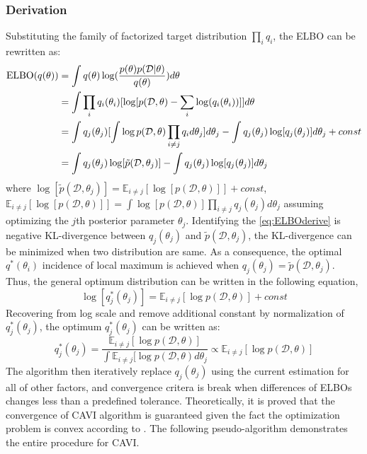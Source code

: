 \subsubsection{Derivation}
Substituting the family of factorized target distribution $\prod_i q_i$, the ELBO can be rewritten as:
\begin{equation}
	\label{eq:ELBOderive}	
	\begin{aligned}
		\textnormal{ELBO}(q(\theta)) &= \int q(\theta)\log(\frac{p(\theta)p(\mathcal{D}|\theta)}{q(\theta)})d\theta \\
		&= \int \prod_i q_i(\theta_i) [\log[p(\mathcal{D},\theta) - \sum_i \log(q_i(\theta_i))]]d\theta \\
		&= \int q_j(\theta_j)[\int \log p(\mathcal{D},\theta) \prod_{i\neq j}q_i d\theta_j]d\theta_j - \int q_j(\theta_j) \log[q_j(\theta_j)]d\theta_j + const\\
		&= \int q_j(\theta_j) \log[\tilde{p}(\mathcal{D},\theta_j)] - \int q_j(\theta_j) \log[q_j(\theta_j)]d\theta_j
	\end{aligned}
\end{equation}
where $\log[\tilde{p}(\mathcal{D},\theta_j)] = \mathbb{E}_{i \neq j}[\log[p(\mathcal{D},\theta)]] + const$,\\ $\mathbb{E}_{i\neq j}[\log[p(\mathcal{D},\theta)]] = \int \log[p(\mathcal{D},\theta)]\prod_{i\neq j}q_j(\theta_j)d\theta_j$ assuming optimizing the $j$th posterior parameter $\theta_j$.
Identifying the \ref{eq:ELBOderive} is negative KL-divergence between $q_j(\theta_j) $ and $\tilde{p}(\mathcal{D},\theta_j)$, the KL-divergence can be minimized when two distribution are same.
As a consequence, the optimal $q^{*}(\theta_i)$ incidence of local maximum is achieved when $q_j(\theta_j) = \tilde{p}(\mathcal{D},\theta_j)$. Thus, the general optimum distribution can be written in the following equation,
\begin{equation}
	\label{eq:logoptimumQ}
	\log[q_j^*(\theta_j)] = \mathbb{E}_{i\neq j}[\log p(\mathcal{D},\theta)] + const
\end{equation}
Recovering from log scale and remove additional constant by normalization of $q_j^*(\theta_j)$, the optimum $q_j^*(\theta_j)$ can be written as:
\begin{equation}
	\label{eq:optimalSolution}
	q_j^*(\theta_j) = \frac{\mathbb{E}_{i\neq j}[\log p(\mathcal{D},\theta)]}{\int \mathbb{E}_{i\neq j}[\log p(\mathcal{D},\theta)d\theta_j} \propto \mathbb{E}_{i\neq j}[\log p(\mathcal{D},\theta)]
\end{equation}
The algorithm then iteratively replace $q_j(\theta_j)$ using the current estimation for all of other factors, and convergence critera is break when differences of ELBOs changes less than a predefined tolerance. Theoretically, it is proved that the convergence of CAVI algorithm is guaranteed given the fact the optimization problem is convex according to \cite{boyd2004convex}. The following pseudo-algorithm demonstrates the entire procedure for CAVI.

